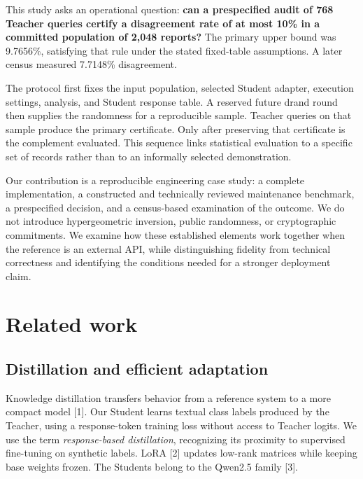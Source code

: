 \documentclass[
  10pt,
]{article}
\let\oldsection\section
\renewcommand{\section}{\needspace{5\baselineskip}\oldsection}
\begin{document}
This study asks an operational question: \textbf{can a prespecified
audit of 768 Teacher queries certify a disagreement rate of at most 10\%
in a committed population of 2,048 reports?} The primary upper bound was
9.7656\%, satisfying that rule under the stated fixed-table assumptions.
A later census measured 7.7148\% disagreement.

The protocol first fixes the input population, selected Student adapter,
execution settings, analysis, and Student response table. A reserved
future drand round then supplies the randomness for a reproducible
sample. Teacher queries on that sample produce the primary certificate.
Only after preserving that certificate is the complement evaluated. This
sequence links statistical evaluation to a specific set of records
rather than to an informally selected demonstration.

Our contribution is a reproducible engineering case study: a complete
implementation, a constructed and technically reviewed maintenance
benchmark, a prespecified decision, and a census-based examination of
the outcome. We do not introduce hypergeometric inversion, public
randomness, or cryptographic commitments. We examine how these
established elements work together when the reference is an external
API, while distinguishing fidelity from technical correctness and
identifying the conditions needed for a stronger deployment claim.

\hypertarget{related-work}{%
\section{Related work}\label{related-work}}

\hypertarget{distillation-and-efficient-adaptation}{%
\subsection{Distillation and efficient
adaptation}\label{distillation-and-efficient-adaptation}}

Knowledge distillation transfers behavior from a reference system to a
more compact model {[}1{]}. Our Student learns textual class labels
produced by the Teacher, using a response-token training loss without
access to Teacher logits. We use the term \emph{response-based
distillation}, recognizing its proximity to supervised fine-tuning on
synthetic labels. LoRA {[}2{]} updates low-rank matrices while keeping
base weights frozen. The Students belong to the Qwen2.5 family {[}3{]}.
\end{document}
